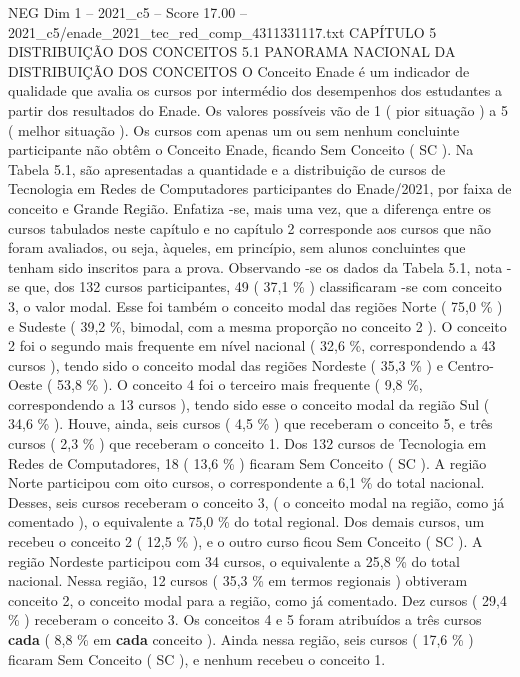 \begin{textsample}{NEG Dim 1 – 2021\_c5 – Score 17.00 – 2021\_c5/enade\_2021\_tec\_red\_comp\_4311331117.txt}  \label{ex:f1_neg_410}
CAPÍTULO 5 DISTRIBUIÇÃO DOS CONCEITOS 5.1 PANORAMA NACIONAL DA DISTRIBUIÇÃO DOS CONCEITOS O Conceito Enade é um indicador de qualidade que avalia os cursos por intermédio dos desempenhos dos estudantes a partir dos resultados do Enade.
Os valores possíveis vão de 1 ( pior situação ) a 5 ( melhor situação ).
Os cursos com apenas um ou sem nenhum concluinte participante não obtêm o Conceito Enade, ficando Sem Conceito ( SC ).
Na Tabela 5.1, são apresentadas a quantidade e a distribuição de cursos de Tecnologia em Redes de Computadores participantes do Enade/2021, por faixa de conceito e Grande Região.
Enfatiza -se, mais uma vez, que a diferença entre os cursos tabulados neste capítulo e no capítulo 2 corresponde aos cursos que não foram avaliados, ou seja, àqueles, em princípio, sem alunos concluintes que tenham sido inscritos para a prova.
Observando -se os dados da Tabela 5.1, nota -se que, dos 132 cursos participantes, 49 ( 37,1 \% ) classificaram -se com conceito 3, o valor modal.
Esse foi também o conceito modal das regiões Norte ( 75,0 \% ) e Sudeste ( 39,2 \%, bimodal, com a mesma proporção no conceito 2 ).
O conceito 2 foi o segundo mais frequente em nível nacional ( 32,6 \%, correspondendo a 43 cursos ), tendo sido o conceito modal das regiões Nordeste ( 35,3 \% ) e Centro-Oeste ( 53,8 \% ).
O conceito 4 foi o terceiro mais frequente ( 9,8 \%, correspondendo a 13 cursos ), tendo sido esse o conceito modal da região Sul ( 34,6 \% ).
Houve, ainda, seis cursos ( 4,5 \% ) que receberam o conceito 5, e três cursos ( 2,3 \% ) que receberam o conceito 1.
Dos 132 cursos de Tecnologia em Redes de Computadores, 18 ( 13,6 \% ) ficaram Sem Conceito ( SC ).
A região Norte participou com oito cursos, o correspondente a 6,1 \% do total nacional.
Desses, seis cursos receberam o conceito 3, ( o conceito modal na região, como já comentado ), o equivalente a 75,0 \% do total regional.
Dos demais cursos, um recebeu o conceito 2 ( 12,5 \% ), e o outro curso ficou Sem Conceito ( SC ).
A região Nordeste participou com 34 cursos, o equivalente a 25,8 \% do total nacional.
Nessa região, 12 cursos ( 35,3 \% em termos regionais ) obtiveram conceito 2, o conceito modal para a região, como já comentado.
Dez cursos ( 29,4 \% ) receberam o conceito 3.
Os conceitos 4 e 5 foram atribuídos a três cursos \textbf{cada} ( 8,8 \% em \textbf{cada} conceito ).
Ainda nessa região, seis cursos ( 17,6 \% ) ficaram Sem Conceito ( SC ), e nenhum recebeu o conceito 1.

\end{textsample}
